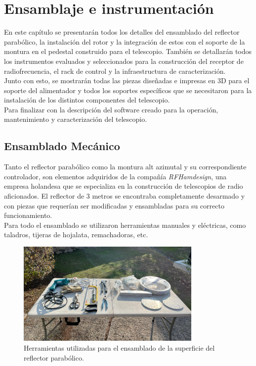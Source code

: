 \chapter{Ensamblaje e instrumentación}

En este capítulo se presentarán todos los detalles del ensamblado del reflector parabólico, la instalación del rotor y la integración de estos con el soporte de la montura en el pedestal construido para el telescopio. También se detallarán todos los instrumentos evaluados y seleccionados para la construcción del receptor de radiofrecuencia, el rack de control y la infraestructura de caracterización.\\

Junto con esto, se mostrarán todas las piezas diseñadas e impresas en 3D para el soporte del alimentador y todos los soportes específicos que se necesitaron para la instalación de los distintos componentes del telescopio.\\

Para finalizar con la descripción del software creado para la operación, mantenimiento y caracterización del telescopio.\\

\section{Ensamblado Mecánico}

Tanto el reflector parabólico como la montura alt azimutal y su correspondiente controlador, son elementos adquiridos de la compañía \textit{RFHamdesign}, una empresa holandesa que se especializa en la construcción de telescopios de radio aficionados. El reflector de 3 metros se encontraba completamente desarmado y con piezas que requerían ser modificadas y ensambladas para su correcto funcionamiento.\\

Para todo el ensamblado se utilizaron herramientas manuales y eléctricas, como taladros, tijeras de hojalata, remachadoras, etc.\\

\begin{figure}
    \centering
    \includegraphics[width=0.8\textwidth]{img/herramientas}
    \caption{Herramientas utilizadas para el ensamblado de la superficie del reflector parabólico.}
    \label{fig:ensamblado1}
\end{figure}

